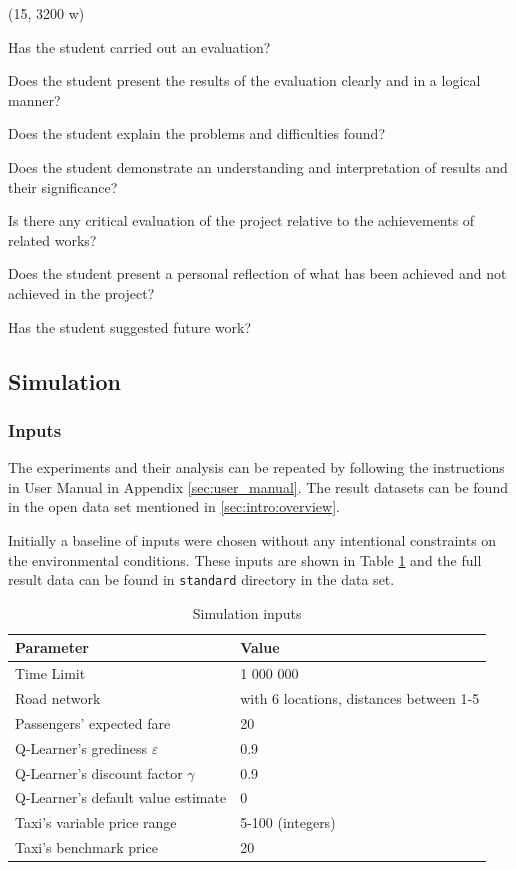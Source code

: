 (15, 3200 w)

Has the student carried out an evaluation?

Does the student present the results of the evaluation clearly and in a logical
manner?

Does the student explain the problems and difficulties found?

Does the student demonstrate an understanding and interpretation of results and
their significance?

Is there any critical evaluation of the project relative to the achievements of
related works?

Does the student present a personal reflection of what has been achieved and
not achieved in the project?

Has the student suggested future work?


\subsection{Simulation}
\label{sec:results}

\subsubsection{Inputs}

The experiments and their analysis can be repeated by following the
instructions in User Manual in Appendix \ref{sec:user_manual}. The result
datasets can be found in the open data set mentioned in
\ref{sec:intro:overview}.

Initially a baseline of inputs were chosen without any intentional constraints
on the environmental conditions. These inputs are shown in Table
\ref{table:input_data} and the full result data can be found in
\texttt{standard} directory in the data set.

\begin{table}
\begin{tabular}{ | l | l | }
  \hline
  Parameter & Value \\ \hline
  Time Limit & 1 000 000 \\
  Road network & with 6 locations, distances between 1-5 \\
  Passengers' expected fare & 20 \\
  Q-Learner's grediness \(\varepsilon\) & 0.9 \\
  Q-Learner's discount factor \(\gamma\) & 0.9 \\
  Q-Learner's default value estimate & 0 \\
  Taxi's variable price range & 5-100 (integers) \\
  Taxi's benchmark price & 20 \\
  \hline
\end{tabular}
\caption{
  Simulation inputs
  \label{table:input_data}
}
\end{table}

